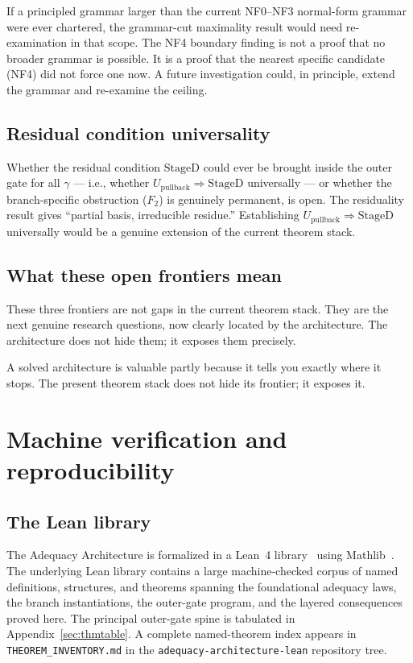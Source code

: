 \documentclass[11pt]{article}
\theoremstyle{plain}
\theoremstyle{definition}
\theoremstyle{remark}
\newcommand{\Upb}{U_{\mathrm{pullback}}}
\newcommand{\StageD}{\mathrm{StageD}}
\begin{document}
If a principled grammar larger than the current NF0--NF3 normal-form
grammar were ever chartered, the grammar-cut maximality result would need
re-examination in that scope.  The NF4 boundary finding is not a proof that
no broader grammar is possible.  It is a proof that the nearest specific
candidate (NF4) did not force one now.  A future investigation could, in
principle, extend the grammar and re-examine the ceiling.

\subsection{Residual condition universality}

Whether the residual condition $\StageD$ could ever be brought inside the
outer gate for all $\gamma$ --- i.e., whether $\Upb \Rightarrow \StageD$
universally --- or whether the branch-specific obstruction ($F_2$) is
genuinely permanent, is open.  The residuality result gives ``partial
basis, irreducible residue.''  Establishing $\Upb \Rightarrow \StageD$
universally would be a genuine extension of the current theorem stack.

\subsection{What these open frontiers mean}

These three frontiers are not gaps in the current theorem stack.  They are
the next genuine research questions, now clearly located by the architecture.
The architecture does not hide them; it exposes them precisely.

A solved architecture is valuable partly because it tells you exactly where it
stops.  The present theorem stack does not hide its frontier; it exposes it.

\section{Machine verification and reproducibility}
\label{sec:machine}

\subsection{The Lean library}

The Adequacy Architecture is formalized in a Lean~4 library~\cite{Lean4}
using Mathlib~\cite{Mathlib}.  The underlying Lean library contains a large
machine-checked corpus of named definitions, structures, and theorems
spanning the foundational adequacy laws, the branch instantiations, the
outer-gate program, and the layered consequences proved here.  The principal
outer-gate spine is tabulated in Appendix~\ref{sec:thmtable}.  A complete
named-theorem index appears in \texttt{THEOREM\_INVENTORY.md} in the
\texttt{adequacy-architecture-lean} repository tree.
\end{document}
